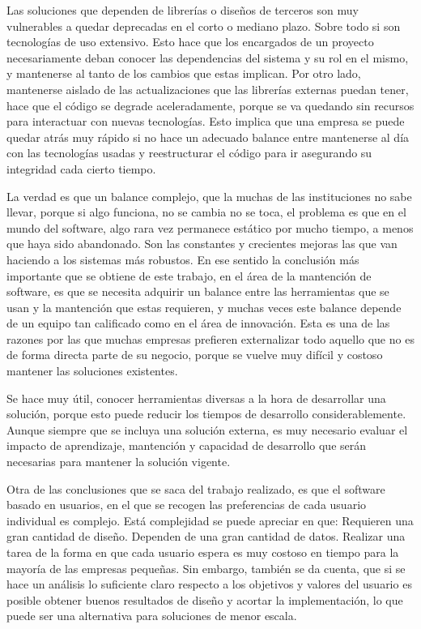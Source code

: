 \par Las soluciones que dependen de librerías o diseños de terceros son muy vulnerables a quedar deprecadas en el corto o mediano plazo. Sobre todo si son tecnologías de uso extensivo. Esto hace que los encargados de un proyecto necesariamente deban conocer las dependencias del sistema y su rol en el mismo, y mantenerse al tanto de los cambios que estas implican. Por otro lado, mantenerse aislado de las actualizaciones que las librerías externas puedan tener, hace que el código se degrade aceleradamente, porque se va quedando sin recursos para interactuar con nuevas tecnologías. Esto implica que una empresa se puede quedar atrás muy rápido si no hace un adecuado balance entre mantenerse al día con las tecnologías usadas y reestructurar el código para ir asegurando su integridad cada cierto tiempo.
\par La verdad es que un balance complejo, que la muchas de las instituciones no sabe llevar, porque si algo funciona, no se cambia no se toca, el problema es que en el mundo del software, algo rara vez permanece estático por mucho tiempo, a menos que haya sido abandonado. Son las constantes y crecientes mejoras las que van haciendo a los sistemas más robustos. En ese sentido la conclusión más importante que se obtiene de este trabajo, en el área de la mantención de software, es que se necesita adquirir un balance entre las herramientas que se usan y la mantención que estas requieren, y muchas veces este balance depende de un equipo tan calificado como en el área de innovación. Esta es una de las razones por las que muchas empresas prefieren externalizar todo aquello que no es de forma directa parte de su negocio, porque se vuelve muy difícil y costoso mantener las soluciones existentes.

\par Se hace muy útil, conocer herramientas diversas a la hora de desarrollar una solución, porque esto puede reducir los tiempos de desarrollo considerablemente. Aunque siempre que se incluya una solución externa, es muy necesario evaluar el impacto de aprendizaje, mantención y capacidad de desarrollo que serán necesarias para mantener la solución vigente.

\par Otra de las conclusiones que se saca del trabajo realizado, es que el software basado en usuarios, en el que se recogen las preferencias de cada usuario individual es complejo. Está complejidad se puede apreciar en que: Requieren una gran cantidad de diseño. Dependen de una gran cantidad de datos. Realizar una tarea de la forma en que cada usuario espera es muy costoso en tiempo para la mayoría de las empresas pequeñas. Sin embargo, también se da cuenta, que si se hace un análisis lo suficiente claro respecto a los objetivos y valores del usuario es posible obtener buenos resultados de diseño y acortar la implementación, lo que puede ser una alternativa para soluciones de menor escala.

